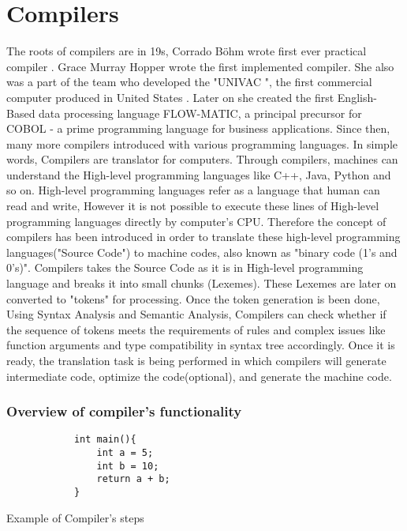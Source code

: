 \section{Compilers}
The roots of compilers are in 19s, Corrado Böhm wrote first ever practical compiler \cite{Theroy_compiler}. Grace Murray Hopper wrote the first implemented compiler. She also was a part of the team who developed the "UNIVAC ", the first commercial computer produced  in United States \cite{Grace_Murray_Hopper_History}. Later on she created the first English-Based data processing language FLOW-MATIC, a principal precursor for COBOL - a prime programming language for business applications. Since then, many more compilers introduced with various programming languages. In simple words, Compilers are translator for computers. Through compilers, machines can understand the High-level programming languages like C++, Java, Python and so on. High-level programming languages refer as a language that human can read and write, However it is not possible to execute these lines of High-level programming languages directly by computer's CPU. Therefore the concept of compilers has been introduced in order to translate these high-level programming languages("Source Code") to machine codes, also known as "binary code (1's and 0's)". Compilers takes the Source Code as it is in High-level programming language and breaks it into small chunks (Lexemes). These Lexemes are later on converted to "tokens" for processing. Once the token generation is been done, Using Syntax Analysis and Semantic Analysis, Compilers can check whether if the sequence of tokens meets the requirements of rules and complex issues like function arguments and type compatibility in syntax tree accordingly. Once it is ready, the translation task is being performed in which compilers will generate intermediate code, optimize the code(optional), and generate the machine code.  


\subsubsection{Overview of compiler's functionality}
\begin{listing}[!hb]

        \begin{verbatim}
            int main(){
                int a = 5;
                int b = 10;
                return a + b;
            }
        \end{verbatim}
    
    \caption{Example of Compiler's steps}
    \label{Listing:1}   
\end{listing}


